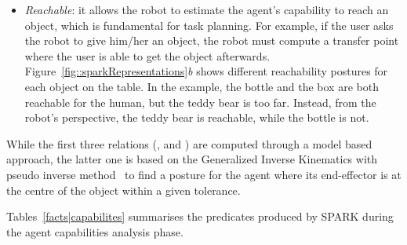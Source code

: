 \begin{itemize}
\item \emph{Reachable}: it allows the robot to estimate the agent's capability
to reach an object, which is fundamental for task planning. For example, if the
user asks the robot to give him/her an object, the robot must compute a transfer
point where the user is able to get the object afterwards. 
Figure~\ref{fig::sparkRepresentations}\emph{b} shows different reachability postures for each object
on the table. In the example, the bottle and the box are both reachable for the
human, but the teddy bear is too far. Instead, from the robot's perspective,
the teddy bear is reachable, while the bottle is not.

\end{itemize}

\begin{figure*}[!t]
	\begin{center}
	\caption{(a) Field of view (FOV) and the field of attention (FOA) of the human. (b) Different reaching postures for the human.}
	\label{fig::sparkRepresentations}
	\end{center}
\end{figure*} 


While the first three relations (,  and
) are computed through a model based approach, the latter one
is based on the Generalized Inverse Kinematics with pseudo inverse
method~\cite{Nakamura90,Baerlocher04} to find a posture for the
agent where its end-effector is at the centre of the object within a given
tolerance.

Tables~\ref{facts|capabilites} summarises the predicates produced by SPARK
during the agent capabilities analysis phase.

